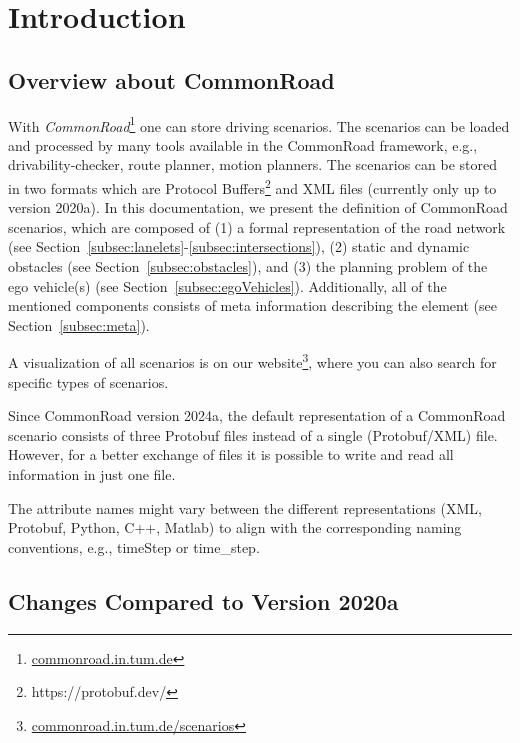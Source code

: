
\section{Introduction}
\label{sec:introduction}
\subsection{Overview about CommonRoad}
With \textit{CommonRoad}\cite{Althoff2017a}\footnote{\href{https://commonroad.in.tum.de}{commonroad.in.tum.de}} one can store driving scenarios. The scenarios can be loaded and processed by many tools available in the CommonRoad framework, e.g., drivability-checker, route planner, motion planners.  
The scenarios can be stored in two formats which are Protocol Buffers\footnote{https://protobuf.dev/} and XML files (currently only up to version 2020a). 
In this documentation, we present the definition of CommonRoad scenarios, which are composed of (1) a formal representation of the road network (see Section~\ref{subsec:lanelets}-\ref{subsec:intersections}), (2) static and dynamic obstacles (see Section~\ref{subsec:obstacles}), and (3) the planning problem of the ego vehicle(s) (see Section~\ref{subsec:egoVehicles}). 
Additionally, all of the mentioned components consists of meta information describing the element (see Section~\ref{subsec:meta}).

A visualization of all scenarios is on our website\footnote{\href{https://commonroad.in.tum.de/scenarios/}{commonroad.in.tum.de/scenarios}}, where you can also search for specific types of scenarios.

Since CommonRoad version 2024a, the default representation of a CommonRoad scenario consists of three Protobuf files instead of a  single (Protobuf/XML) file.
However, for a better exchange of files it is possible to write and read all information in just one file.

The attribute names might vary between the different representations (XML, Protobuf, Python, C++, Matlab) to align with the corresponding naming conventions, e.g., timeStep or time\_step.


\subsection{Changes Compared to Version 2020a}

